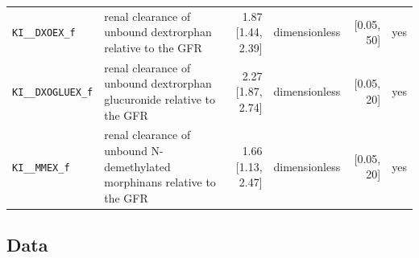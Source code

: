 \documentclass{article}
\begin{document}
\begin{longtable}{llrlrl}
\texttt{KI\_\_DXOEX\_f} & renal clearance of unbound dextrorphan relative to the GFR & 1.87 [1.44, 2.39] & dimensionless & [0.05, 50] & yes \\
\texttt{KI\_\_DXOGLUEX\_f} & renal clearance of unbound dextrorphan glucuronide relative to the GFR & 2.27 [1.87, 2.74] & dimensionless & [0.05, 20] & yes \\
\texttt{KI\_\_MMEX\_f} & renal clearance of unbound N-demethylated morphinans relative to the GFR & 1.66 [1.13, 2.47] & dimensionless & [0.05, 20] & yes \\
\end{longtable}

\subsection{Data}
\end{document}

